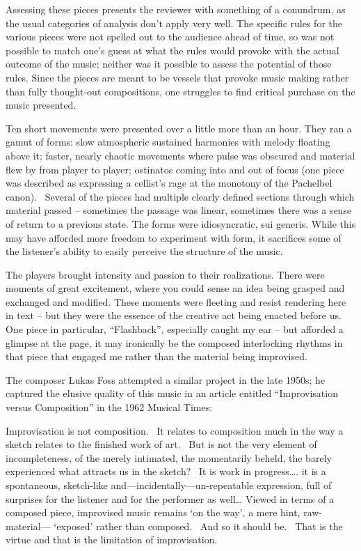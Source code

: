 Assessing these pieces presents the reviewer with something of a conundrum, as the usual categories of analysis don’t apply very well. The specific rules for the various pieces were not spelled out to the audience ahead of time, so was not possible to match one’s guess at what the rules would provoke with the actual outcome of the music; neither was it possible to assess the potential of those rules. Since the pieces are meant to be vessels that provoke music making rather than fully thought-out compositions, one struggles to find critical purchase on the music presented.

Ten short movements were presented over a little more than an hour. They ran a gamut of forms: slow atmospheric sustained harmonies with melody floating above it; faster, nearly chaotic movements where pulse was obscured and material flew by from player to player; ostinatos coming into and out of focus (one piece was described as expressing a cellist’s rage at the monotony of the Pachelbel canon).  Several of the pieces had multiple clearly defined sections through which material passed -- sometimes the passage was linear, sometimes there was a sense of return to a previous state. The forms were idiosyncratic, sui generis. While this may have afforded more freedom to experiment with form, it sacrifices some of the listener’s ability to easily perceive the structure of the music.


The players brought intensity and passion to their realizations. There were moments of great excitement, where you could sense an idea being grasped and exchanged and modified. These moments were fleeting and resist rendering here in text – but they were the essence of the creative act being enacted before us. One piece in particular, “Flashback”, especially caught my ear – but afforded a glimpse at the page, it may ironically be the composed interlocking rhythms in that piece that engaged me rather than the material being improvised.

The composer Lukas Foss attempted a similar project in the late 1950s; he captured the elusive quality of this music in an article entitled “Improvisation versus Composition” in the 1962 Musical Times:

Improvisation is not composition.  It relates to composition much in the way a sketch relates to the finished work of art.  But is not the very element of incompleteness, of the merely intimated, the momentarily beheld, the barely experienced what attracts us in the sketch?  It is work in progress…. it is a spontaneous, sketch-like and—incidentally—un-repeatable expression, full of surprises for the listener and for the performer as well… Viewed in terms of a composed piece, improvised music remains ‘on the way’, a mere hint, raw-material— ‘exposed’ rather than composed.  And so it should be.  That is the virtue and that is the limitation of improvisation.

